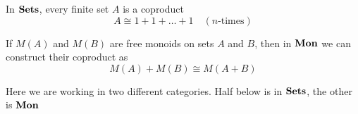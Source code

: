 \documentclass[11pt]{article}
\begin{document}
In \(\operatorname{\textbf{Sets}}\), every finite set \(A\) is a coproduct
\begin{equation*}
A\cong1+1+\dots+1\quad(n\text{-times})
\end{equation*}
\begin{examplle}[]
If \(M(A)\) and \(M(B)\) are free monoids on sets \(A\) and \(B\), then in
\(\operatorname{\textbf{Mon}}\) we can construct their coproduct as
\begin{equation*}
M(A)+M(B)\cong M(A+B)
\end{equation*}

\begin{center}\end{center}
Here we are working in two different categories. Half below is in \(\operatorname{\textbf{Sets}}\),
the other is \(\operatorname{\textbf{Mon}}\)
\end{examplle}
\end{document}
